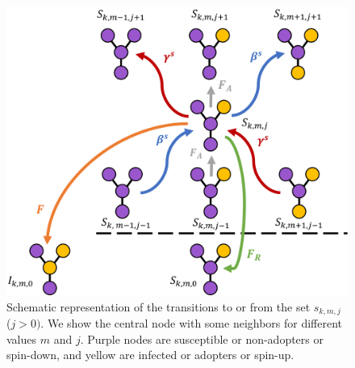 \begin{figure}
    \centering
    \includegraphics[width=\columnwidth]{Figs/Appendix2_Threshold/AME_PLOT.png}
    \caption[Schematic representation of the transitions to or from the set $s_{k,m,j}$]{\label{fig:ame_plot1} Schematic representation of the transitions to or from the set $s_{k,m,j}$ ($j > 0)$. We show the central node with some neighbors for different values $m$ and $j$. Purple nodes are susceptible or non-adopters or spin-down, and yellow are infected or adopters or spin-up.}
\end{figure}
    
